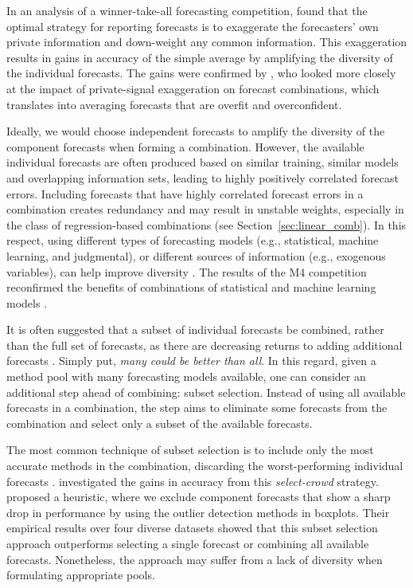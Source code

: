 \documentclass[a4paper,11pt]{article}
\begin{document}
In an analysis of a winner-take-all forecasting competition, \citet{Lichtendahl2013-ws} found that the optimal strategy for reporting forecasts is to exaggerate the forecasters' own private information and down-weight any common information. This exaggeration results in gains in accuracy of the simple average by amplifying the diversity of the individual forecasts. The gains were confirmed by \citet{Grushka-Cockayne2017-dj}, who looked more closely at the impact of private-signal exaggeration on forecast combinations, which translates into averaging forecasts that are overfit and overconfident.

Ideally, we would choose independent forecasts to amplify the diversity of the component forecasts when forming a combination. However, the available individual forecasts are often produced based on similar training, similar models and overlapping information sets, leading to highly positively correlated forecast errors. Including forecasts that have highly correlated forecast errors in a combination creates redundancy and may result in unstable weights, especially in the class of regression-based combinations (see Section~\ref{sec:linear_comb}). In this respect, using different types of forecasting models (e.g., statistical, machine learning, and judgmental), or different sources of information (e.g., exogenous variables), can help improve diversity \citep{Atiya2020-ge}. The results of the M4 competition reconfirmed the benefits of combinations of statistical and machine learning models \citep{Makridakis2020-hu}.

It is often suggested that a subset of individual forecasts be combined, rather than the full set of forecasts, as there are decreasing returns to adding additional forecasts \citep{Armstrong2001-sj,Zhou2002-cg,Hibon2005-ok,Geweke2011-xk,Lichtendahl2020-ut}. Simply put, \textit{many could be better than all}. In this regard, given a method pool with many forecasting models available, one can consider an additional step ahead of combining: subset selection. Instead of using all available forecasts in a combination, the step aims to eliminate some forecasts from the combination and select only a subset of the available forecasts.

The most common technique of subset selection is to include only the most accurate methods in the combination, discarding the worst-performing individual forecasts \citep[e.g.,][]{Granger2004-sw}. \citet{Mannes2014-dl} investigated the gains in accuracy from this \textit{select-crowd} strategy. \citet{Kourentzes2019-na} proposed a heuristic, where we exclude component forecasts that show a sharp drop in performance by using the outlier detection methods in boxplots. Their empirical results over four diverse datasets showed that this subset selection approach outperforms selecting a single forecast or combining all available forecasts. Nonetheless, the approach may suffer from a lack of diversity when formulating appropriate pools.
\end{document}
